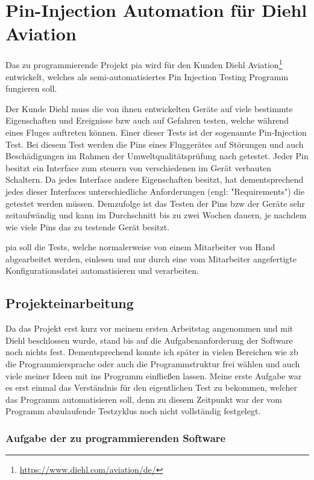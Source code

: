 \chapter{Pin-Injection Automation für Diehl Aviation}
\label{ch:pia}

Das zu programmierende Projekt \ac{pia} wird für den Kunden Diehl Aviation\footnote{\url{https://www.diehl.com/aviation/de/}} entwickelt, welches als semi-automatisiertes Pin Injection Testing Programm fungieren soll.

Der Kunde Diehl muss die von ihnen entwickelten Geräte auf viele bestimmte Eigenschaften und Ereignisse \ac{bzw} auch auf Gefahren testen, welche während eines Fluges auftreten können. Einer dieser Tests ist der sogenannte Pin-Injection Test.
Bei diesem Test werden die Pins eines Fluggerätes auf Störungen und auch Beschädigungen im Rahmen der Umweltqualitätsprüfung nach \cite{DO-160} getestet. Jeder Pin besitzt ein Interface zum steuern von verschiedenen im Gerät verbauten Schaltern. Da jedes Interface andere Eigenschaften besitzt, hat dementsprechend jedes dieser Interfaces unterschiedliche Anforderungen (engl: "Requirements") die getestet werden müssen.
Demzufolge ist das Testen der Pins \ac{bzw} der Geräte sehr zeitaufwändig und kann im Durchschnitt bis zu zwei Wochen dauern, je nachdem wie viele Pins das zu testende Gerät besitzt.

\ac{pia} soll die Tests, welche normalerweise von einem Mitarbeiter von Hand abgearbeitet werden, einlesen und nur durch eine vom Mitarbeiter angefertigte Konfigurationsdatei automatisieren und verarbeiten.


\section{Projekteinarbeitung}
\label{sec:prj-einarbeitung}

Da das Projekt erst kurz vor meinem ersten Arbeitstag angenommen und mit Diehl beschlossen wurde, stand bis auf die Aufgabenanforderung der Software noch nichts fest. Dementsprechend konnte ich später in vielen Bereichen wie \ac{zb} die Programmiersprache oder auch die Programmstruktur frei wählen und auch viele meiner Ideen mit ins Programm einfließen lassen. Meine erste Aufgabe war es erst einmal das Verständnis für den eigentlichen Test zu bekommen, welcher das Programm automatisieren soll, denn zu diesem Zeitpunkt war der vom Programm abzulaufende Testzyklus noch nicht vollständig festgelegt. 


\subsection{Aufgabe der zu programmierenden Software}
\label{subsec:aufgabe-software}

